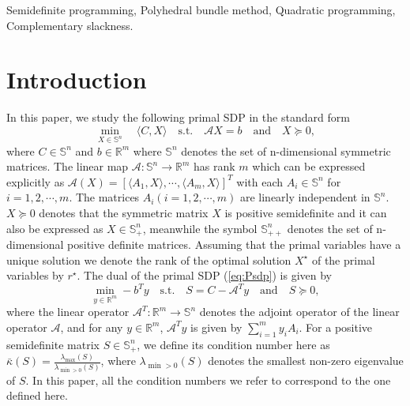 \documentclass{jcmlatex}
\begin{document}
\begin{keywords}
Semidefinite programming, Polyhedral bundle method, Quadratic programming, Complementary slackness.
\end{keywords}


\section{Introduction}
\label{sec:into}
In this paper, we study the following primal SDP in the standard form
\begin{equation}\label{eq:Psdp}
\underset{X\in \mathbb{S}^{n}}{\min}\quad\langle C,X \rangle\quad \text{s.t.}\quad \mathcal{A}X=b  \quad \text{and}\quad X \succeq 0,
\end{equation}
where \(C \in \mathbb{S}^{n}\) and \(b \in \mathbb{R}^{m}\) where \(\mathbb{S}^{n}\) denotes the set of n-dimensional symmetric matrices. The linear map \(\mathcal{A}: \mathbb{S}^{n} \rightarrow\mathbb{R}^{m}\) has rank \(m\) which can be expressed explicitly as \(\mathcal{A}(X) = [\langle A_{1},X \rangle,\cdots, \langle A_{m},X \rangle]^{T}\) with each \( A_{i}\in \mathbb{S}^{n} \) for \( i = 1, 2, \cdots, m \). The matrices \( A_{i} (i = 1, 2, \cdots, m) \) are linearly independent in \( \mathbb{S}^{n} \). \(X \succeq 0\) denotes that the symmetric matrix \(X\) is positive semidefinite and it can also be expressed as \(X \in \mathbb{S}^{n}_{+}\), meanwhile the symbol \(\mathbb{S}^{n}_{++}\) denotes the set of n-dimensional positive definite matrices. Assuming that the primal variables have a unique solution we denote the rank of the optimal solution \(X^{\star}\) of the primal variables by \(r^{\star}\). The dual of the primal SDP (\ref{eq:Psdp}) is given by
\begin{equation}\label{eq:Dsdp}
\underset{y\in \mathbb{R}^{m}}{\min}-b^{T}y\quad\text{s.t.}\quad S=C-\mathcal{A}^{T}y\quad\text{and}\quad S\succeq 0,
\end{equation}
where the linear operator \(\mathcal{A}^{T}:\mathbb{R}^{m}\to \mathbb{S}^{n}\) denotes the adjoint operator of the linear operator \(\mathcal{A}\), and for any \(y \in \mathbb{R}^{m}\), \(\mathcal{A}^{T}y\) is given by \(\sum_{i = 1}^{m}y_{i}A_{i}\). For a positive semidefinite matrix \( S \in \mathbb{S}^{n}_{+} \), we define its condition number here as \( \mathcal{\bar{\kappa}}(S) = \frac{\lambda_{\max}(S)}{\lambda_{\min>0}(S)} \), where \( \lambda_{\min>0}(S) \) denotes the smallest non-zero eigenvalue of \( S \). In this paper, all the condition numbers we refer to correspond to the one defined here.
\end{document}
